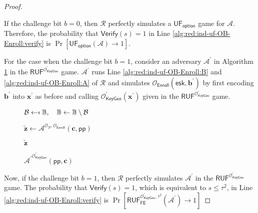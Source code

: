 \begin{proof}
\begin{figure}[h]
\end{figure}

	If the challenge bit $b = 0$, then $\mathcal{R}$ perfectly simulates a $\textsf{UF}_{\textsf{option}}$ game for $\mathcal{A}$. Therefore, the probability that $\textsf{Verify}(s) = 1$ in Line \ref{alg:red:ind-uf-OB-Enroll:verify} is $\Pr[\textsf{UF}_{\textsf{option}}(\mathcal{A}) \to 1]$.

	For the case when the challenge bit $b = 1$, consider an adversary $\mathcal{A}^\prime$ in Algorithm \ref{alg:adv:ind-uf-OB-Enroll} in the $\textsf{RUF}^{ \mathcal{O}^\prime_{\textsf{KeyGen}} }$ game. $\mathcal{A}^\prime$ runs Line \ref{alg:red:ind-uf-OB-Enroll:B} and \ref{alg:red:ind-uf-OB-Enroll:A} of $\mathcal{R}$ and simulates $\mathcal{O}_{\textsf{Enroll}}( \textsf{esk}, \mathbf{b}^\prime )$ by first encoding $\mathbf{b}^\prime$ into $\mathbf{x}^\prime$ as before and calling $\mathcal{O}_\textsf{KeyGen}^\prime(\mathbf{x}^\prime)$ given in the $\textsf{RUF}^{ \mathcal{O}^\prime_{\textsf{KeyGen}} }$ game. 


\begin{figure}[h]
\centering

	\begin{minipage}[t]{0.45\textwidth}
	\begin{algorithm}[H]
	\caption{${\mathcal{A}^\prime}^{\mathcal{O}^\prime_{\textsf{KeyGen}} }(\textsf{pp}, \mathbf{c})$}
	\label{alg:adv:ind-uf-OB-Enroll}
	\begin{algorithmic}[1]
		\State $\mathcal{B} \getsdollar \mathbb{B}, \quad \mathbb{B} \gets \mathbb{B} \setminus \mathcal{B}$ 
		
		\State $\mathbf{\tilde{z}} \gets {\mathcal{A}}^{\mathcal{O}_{\mathcal{B}}, \mathcal{O}_\textsf{Enroll} } (\mathbf{c}, \textsf{pp})$

		\State \Return $\mathbf{\tilde{z}}$
	\end{algorithmic}
	\end{algorithm}
	\end{minipage}

\end{figure}

Now, if the challenge bit $b = 1$, then $\mathcal{R}$ perfectly simulates $\mathcal{A}^\prime$ in the $\textsf{RUF}^{ \mathcal{O}^\prime_{\textsf{KeyGen}} }$ game. The probability that $\textsf{Verify}(s) = 1$, which is equivalent to $s \leq \tau^2$, in Line \ref{alg:red:ind-uf-OB-Enroll:verify} is $\Pr[\textsf{RUF}^{\mathcal{O}^\prime_{\textsf{KeyGen}}, \tau^2}_{\textsf{FE}}(\mathcal{A}^\prime) \to 1 ]$


\end{proof}
